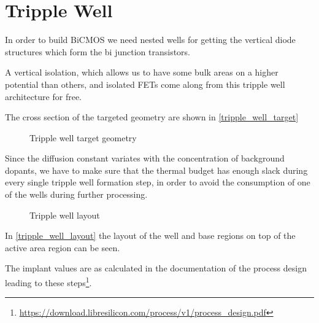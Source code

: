 \section{Tripple Well}\label{tripple_well_chapter}

In order to build BiCMOS we need nested wells for getting the vertical diode structures which form the bi junction transistors.

A vertical isolation, which allows us to have some bulk areas on a higher potential than others, and isolated FETs come along from this tripple well architecture for free.

The cross section of the targeted geometry are shown in \autoref{tripple_well_target}

\begin{figure}[H]
	\centering
	\begin{tikzpicture}[node distance = 3cm, auto, thick,scale=\CrossAndTopSectionBig, every node/.style={transform shape}]
		
	\end{tikzpicture}
	\caption{Tripple well target geometry}
	\label{tripple_well_target}
\end{figure}

Since the diffusion constant variates with the concentration of background dopants, we have to make sure that the thermal budget has enough slack during every single tripple well formation step, in order to avoid the consumption of one of the wells during further processing.

\begin{figure}[H]
	\centering
	\begin{tikzpicture}[node distance =1cm, auto, thick,scale=\VLSILayout, every node/.style={transform shape}]
		
	\end{tikzpicture}
	\caption{Tripple well layout}
	\label{tripple_well_layout}
\end{figure}

In \autoref{tripple_well_layout} the layout of the well and base regions on top of the active area region can be seen.

The implant values are as calculated in the documentation of the process design leading to these steps\footnote{\url{https://download.libresilicon.com/process/v1/process_design.pdf}}.

\newpage


\newpage



